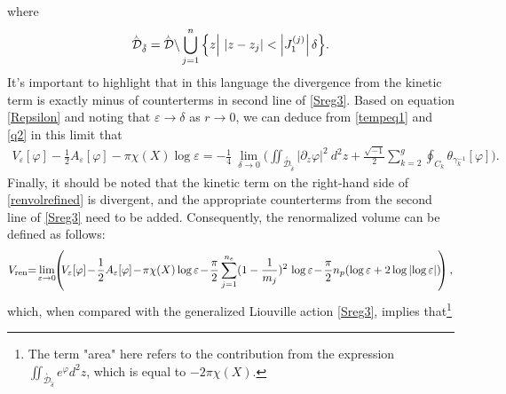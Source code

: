 \documentclass[a4paper,11pt]{article}
\newcommand{\singfund}{\overset{{}_{\curlywedge}}{\mathcal{D}}}
\begin{document}
where
\begin{equation}
\singfund_{\tilde\delta} = \singfund\backslash \bigcup_{j=1}^n \Big{\{} z\Big|~|z-z_j| < \left|J_1^{(j)}\right| \delta\Big{\}}.\label{q2}
\end{equation}
It's important to highlight that in this language the divergence from the kinetic term is exactly minus of counterterms in second line of \eqref{Sreg3}.  Based on equation \eqref{Repsilon} and noting that $\varepsilon \rightarrow \delta$ as $r \rightarrow 0$, we can deduce from \eqref{tempeq1} and \eqref{q2} in this limit that
\begin{equation}
\begin{aligned}
V_\varepsilon[\varphi]-\frac12 A_\varepsilon[\varphi] - \pi \chi(X) \log \varepsilon = -\frac{1}{4}~ \lim_{\delta \to 0}\Big(
\iint_{\singfund_{\tilde\delta}} |\partial_z\varphi|^2 ~d^2z 
+ \frac{\sqrt{-1}}{2} \sum_{k=2}^{g} \oint_{C_k} \theta_{\gamma^{-1}_k}[\varphi]
\Big).
\end{aligned}
\label{renvolrefined}
\end{equation}
Finally, it should be noted that the kinetic term on the right-hand side of \eqref{renvolrefined} is divergent, and the appropriate counterterms from the second line of \eqref{Sreg3} need to be added. Consequently, the renormalized volume can be defined as follows:
\begin{equation}
V_{\text{ren}}\hspace{-1mm}=\hspace{-.5mm}\lim_{\varepsilon \to 0}\hspace{-1mm}\left(\hspace{-1mm} V_{\varepsilon}[\varphi]\hspace{-.5mm} -\hspace{-.5mm} \frac{1}{2} A_{\varepsilon}[\varphi]\hspace{-.5mm} -\hspace{-.5mm} \pi \chi(X) \log \varepsilon\hspace{-.5mm} - \hspace{-.5mm}\frac{\pi}{2} \sum_{j=1}^{n_e} (1 - \frac{1}{m_j})^2\hspace{.5mm} \log \varepsilon\hspace{-.5mm} -\hspace{-.5mm} \frac{\pi}{2} n_p (\log \varepsilon + 2 \log \left|\log \varepsilon\right|)\hspace{-1mm} \right),\label{Vren}
\end{equation}
which, when compared with the generalized Liouville action \eqref{Sreg3}, implies that\footnote{The term "area" here refers to the contribution from the expression $\iint_{\singfund_{\tilde\delta}}  e^\varphi  d^2z$, which is equal to $-2\pi\chi(X)$.}
\end{document}
